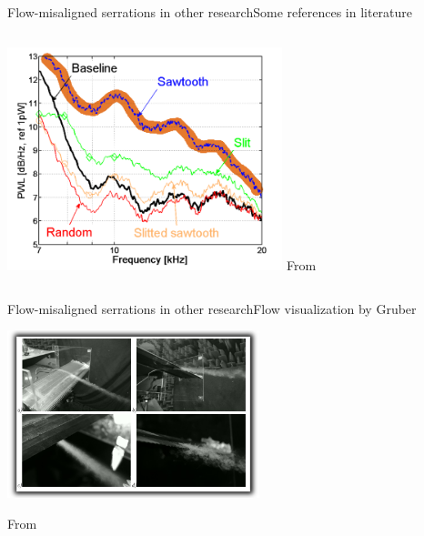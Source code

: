 \documentclass[xcolor=table,aspectratio=169]{beamer}
\begin{document}
\begin{frame}[b]{Flow-misaligned serrations in other research}{Some references in literature}
\begin{columns}
         \vspace{-5mm}

         \begin{flushright}
            \includegraphics[width=0.6\textwidth]{./media/SerrationIncrease_Gruber2013.png}\newline
            \tiny From \cite{Gruber2013}
         \end{flushright}

   \end{columns}
   
\end{frame}

\begin{frame}[b]{Flow-misaligned serrations in other research}{Flow visualization by Gruber}
    \begin{center}
        \includegraphics[width=0.55\textwidth]{media/GruberFlowViz.png}
        \begin{flushright}
            \vspace{-3mm}
            \scriptsize{
                From \cite{Gruber2011}\hspace{3cm}
            }
        \end{flushright}
    \end{center}
\end{frame}
\end{document}
